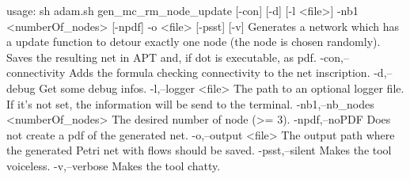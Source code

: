 usage: sh adam.sh gen_mc_rm_node_update [-con] [-d] [-l <file>] -nb1 <numberOf_nodes> [-npdf]
       -o <file> [-psst] [-v]
Generates a network which has a update function to detour exactly one node (the node is chosen
randomly). Saves the resulting net in APT and, if dot is executable, as pdf.
 -con,--connectivity                Adds the formula checking connectivity to the net
                                    inscription.
 -d,--debug                         Get some debug infos.
 -l,--logger <file>                 The path to an optional logger file. If it's not set, the
                                    information will be send to the terminal.
 -nb1,--nb_nodes <numberOf_nodes>   The desired number of node (>= 3).
 -npdf,--noPDF                      Does not create a pdf of the generated net.
 -o,--output <file>                 The output path where the generated Petri net with flows
                                    should be saved.
 -psst,--silent                     Makes the tool voiceless.
 -v,--verbose                       Makes the tool chatty.
